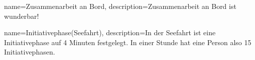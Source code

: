 {
    name={Zusammenarbeit an Bord},
    description={Zusammenarbeit an Bord ist wunderbar!}
}

{
    name=Initiativephase(Seefahrt),
    description={In der Seefahrt ist eine Initiativephase auf 4 Minuten festgelegt. In einer Stunde hat eine Person also 15 Initiativephasen.}
}
